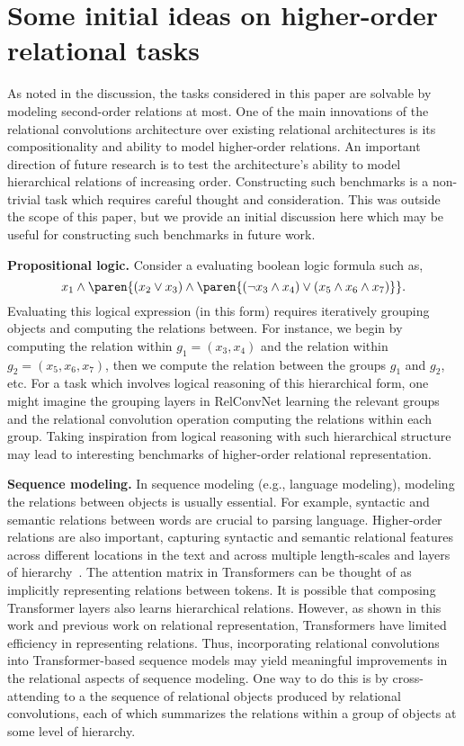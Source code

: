 \section{Some initial ideas on higher-order relational tasks}

As noted in the discussion, the tasks considered in this paper are solvable by modeling second-order relations at most. One of the main innovations of the relational convolutions architecture over existing relational architectures is its compositionality and ability to model higher-order relations. An important direction of future research is to test the architecture's ability to model hierarchical relations of increasing order. Constructing such benchmarks is a non-trivial task which requires careful thought and consideration. This was outside the scope of this paper, but we provide an initial discussion here which may be useful for constructing such benchmarks in future work.

\textbf{Propositional logic.} Consider a evaluating boolean logic formula such as, 
\begin{equation*}
    x_1 \land \paren{(x_2 \lor x_3) \land \paren{(\lnot x_3 \land x_4) \lor (x_5 \land x_6 \land x_7)}}.
\end{equation*}
Evaluating this logical expression (in this form) requires iteratively grouping objects and computing the relations between. For instance, we begin by computing the relation within $g_1 = (x_3, x_4)$ and the relation within $g_2 = (x_5, x_6, x_7)$, then we compute the relation between the groups $g_1$ and $g_2$, etc. For a task which involves logical reasoning of this hierarchical form, one might imagine the grouping layers in RelConvNet learning the relevant groups and the relational convolution operation computing the relations within each group. Taking inspiration from logical reasoning with such hierarchical structure may lead to interesting benchmarks of higher-order relational representation.

\textbf{Sequence modeling.} In sequence modeling (e.g., language modeling), modeling the relations between objects is usually essential. For example, syntactic and semantic relations between words are crucial to parsing language. Higher-order relations are also important, capturing syntactic and semantic relational features across different locations in the text and across multiple length-scales and layers of hierarchy~\citep[see for example some relevant work in linguistics][]{frank2012hierarchical,rosario2002descent}. The attention matrix in Transformers can be thought of as implicitly representing relations between tokens. It is possible that composing Transformer layers also learns hierarchical relations. However, as shown in this work and previous work on relational representation, Transformers have limited efficiency in representing relations. Thus, incorporating relational convolutions into Transformer-based sequence models may yield meaningful improvements in the relational aspects of sequence modeling. One way to do this is by cross-attending to a the sequence of relational objects produced by relational convolutions, each of which summarizes the relations within a group of objects at some level of hierarchy.

